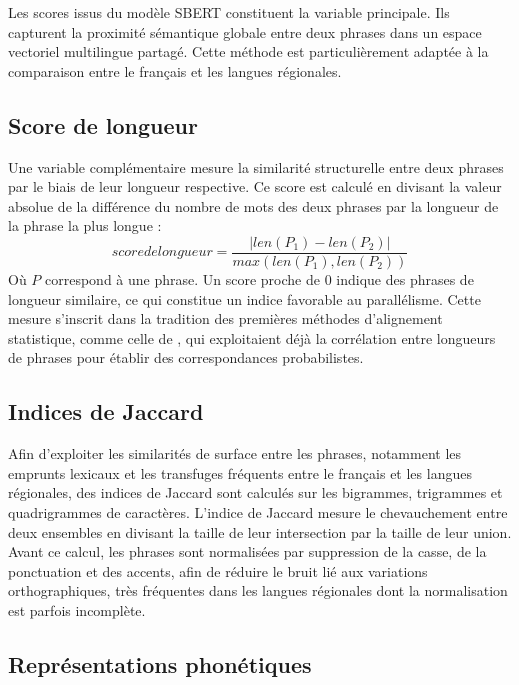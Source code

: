 Les scores issus du modèle SBERT constituent la variable principale. Ils capturent la proximité sémantique
globale entre deux phrases dans un espace vectoriel multilingue partagé. Cette méthode est particulièrement adaptée à
la comparaison entre le français et les langues régionales.

\newpage

\subsection{Score de longueur}

Une variable complémentaire mesure la similarité structurelle entre deux phrases par le biais de leur
longueur respective. Ce score est calculé en divisant la valeur absolue de la différence du nombre de mots
des deux phrases par la longueur de la phrase la plus longue{ :}
\[ score de longueur = \frac{\left| len(P_{1})-len(P_{2}) \right|}{max(len(P_{1}),len(P_{2}))} \]
Où $P$ correspond à une phrase.
Un score proche de 0 indique des phrases de longueur similaire, ce qui constitue un indice favorable au
parallélisme. Cette mesure s'inscrit dans la tradition des premières méthodes d'alignement statistique,
comme celle de \citet{gale_1991}, qui exploitaient déjà la corrélation entre longueurs de phrases pour
établir des correspondances probabilistes.

\subsection{Indices de Jaccard}

Afin d'exploiter les similarités de surface entre les phrases, notamment les emprunts lexicaux et les
transfuges fréquents entre le français et les langues régionales, des indices de Jaccard
sont calculés sur les bigrammes, trigrammes et quadrigrammes de caractères. L'indice de Jaccard mesure le
chevauchement entre deux ensembles en divisant la taille de leur intersection par la taille de leur union.
Avant ce calcul, les phrases sont normalisées par suppression de la casse, de la ponctuation et des accents,
afin de réduire le bruit lié aux variations orthographiques, très fréquentes dans les langues
régionales dont la normalisation est parfois incomplète.

\subsection{Représentations phonétiques}

